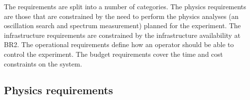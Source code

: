 \documentclass[a4paper]{article}
\begin{document}
The requirements are split into a number of categories.
The physics requirements are those that are constrained by the need to perform the physics analyses (an oscillation search and spectrum measurement) planned for the experiment.
The infrastructure requirements are constrained by the infrastructure availability at BR2.
The operational requirements define how an operator should be able to control the experiment.
The budget requirements cover the time and cost constraints on the system.

\subsection{Physics requirements}

\renewcommand*{\theenumi}{\thesubsection.\arabic{enumi}}
\renewcommand*{\theenumii}{\thesubsection.\arabic{enumii}}
\end{document}
